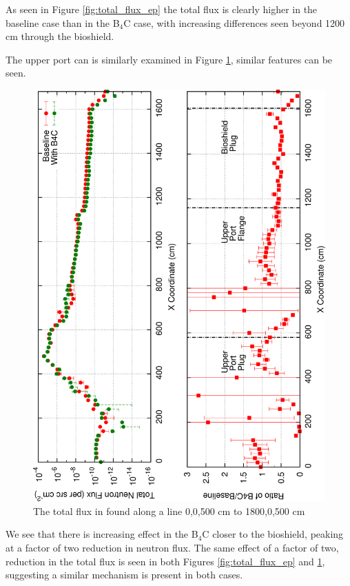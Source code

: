 \documentclass[12pt]{article}
\begin{document}
As seen in Figure \ref{fig:total_flux_ep} the total flux is clearly higher in 
the baseline case than in the B$_4$C case, with increasing differences seen
beyond 1200 cm through the bioshield.

\newpage
\clearpage
The upper port can is similarly examined in Figure \ref{fig:total_flux_up},
similar features can be seen.
\begin{figure}[ht!]
  \centering
  \includegraphics[angle=-90,clip,scale=0.15]{../plots/neutron/total_flux_up.png}     
  \caption{The total flux in found along a line 0,0,500 cm to 1800,0,500 cm}
  \label{fig:total_flux_up}
\end{figure}
We see that there is increasing effect in the B$_4$C closer to the bioshield, peaking
at a factor of two reduction in neutron flux. The same effect of a factor of two, reduction
in the total flux is seen in both Figures \ref{fig:total_flux_ep} and \ref{fig:total_flux_up}, 
suggesting a similar mechanism is present in both cases. 
\end{document}
